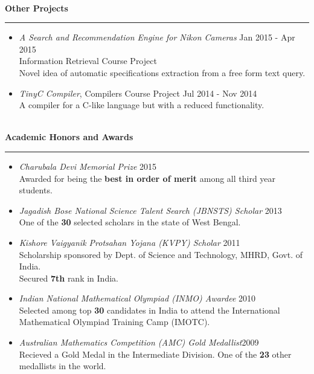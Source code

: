 \documentclass[a4paper,10pt,oneside]{article}
\newcommand{\heading}[1]{
 {\Large \textbf{#1}}
  \vspace{0.4em}
  \hrule
  \vspace{0.4em}
}
\newcommand{\EntryGap}{ ~\\ }
\begin{document}

\EntryGap
\pagebreak
\heading{Other Projects}
\begin{itemize}
  \setlength{\itemsep}{0.0em}
  \item \emph{A Search and Recommendation Engine for Nikon Cameras} \hfill Jan 2015 - Apr 2015\\
  Information Retrieval Course Project\\
  Novel idea of automatic specifications extraction from a free form text query.
  \item \emph{TinyC Compiler}, Compilers Course Project \hfill Jul 2014 - Nov 2014\\
  A compiler for a C-like language but with a reduced functionality.
\end{itemize}


\EntryGap
\heading{Academic Honors and Awards}
\begin{itemize}
 \setlength{\itemsep}{0.0em}
 \item \emph{Charubala Devi Memorial Prize} \hfill 2015\\
Awarded for being the \textbf{best in order of merit} among all third year students.
\item \emph{Jagadish Bose National Science Talent Search (JBNSTS) Scholar} \hfill 2013\\
One of the \textbf{30} selected scholars in the state of West Bengal.
\item\emph{Kishore Vaigyanik Protsahan Yojana (KVPY) Scholar} \hfill 2011\\
Scholarship sponsored by Dept. of Science and Technology, MHRD, Govt. of India.\\
Secured \textbf{7th} rank in India.
\item\emph{Indian National Mathematical Olympiad (INMO) Awardee} \hfill 2010\\
Selected among top \textbf{30} candidates in India to attend the International Mathematical Olympiad Training Camp (IMOTC).
\item\emph{Australian Mathematics Competition (AMC) Gold Medallist}\hfill 2009\\
Recieved a Gold Medal in the Intermediate Division. One of the \textbf{23} other medallists in the world.
\end{itemize}
\end{document}
